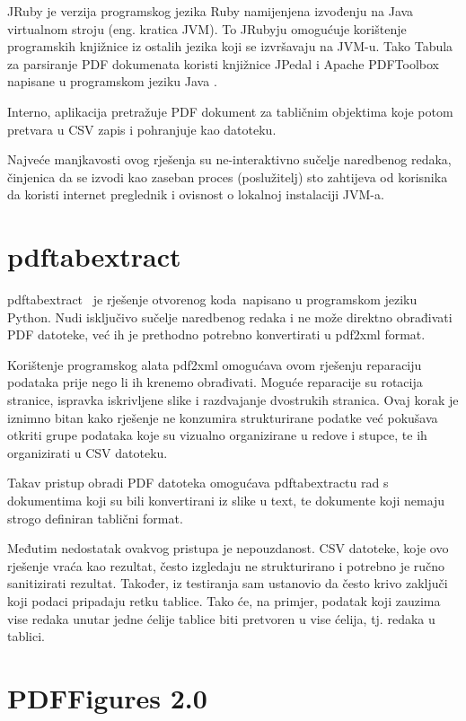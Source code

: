 \documentclass[times, utf8, zavrsni]{fer}
\begin{document}
JRuby je verzija programskog jezika Ruby namijenjena izvođenju na Java
virtualnom stroju \cite{java_virtual_machine_specification} (eng. kratica JVM).
To JRubyju omogućuje korištenje
programskih knjižnice iz ostalih jezika koji se izvršavaju na JVM-u. Tako
Tabula za parsiranje PDF dokumenata koristi knjižnice JPedal i Apache
PDFToolbox \cite{apache_pdftoolbox_specification} napisane u programskom
jeziku Java \cite{java_language_specification}.

Interno, aplikacija pretražuje PDF dokument za tabličnim objektima koje potom
pretvara u CSV zapis i pohranjuje kao datoteku.

Najveće manjkavosti ovog rješenja su ne-interaktivno sučelje naredbenog redaka,
činjenica da se izvodi kao zaseban proces (poslužitelj) sto zahtijeva od
korisnika
da koristi internet preglednik i ovisnost o lokalnoj instalaciji JVM-a.

\section{pdftabextract}

pdftabextract \cite{pdftabextract_repository} je rješenje otvorenog koda napisano
u programskom jeziku Python.
Nudi isključivo sučelje naredbenog redaka i ne može direktno obrađivati PDF
datoteke, već ih je prethodno potrebno konvertirati u pdf2xml format.

Korištenje programskog alata pdf2xml omogućava ovom rješenju reparaciju
podataka prije nego li ih krenemo obrađivati. Moguće reparacije su rotacija
stranice, ispravka iskrivljene slike i razdvajanje dvostrukih stranica. Ovaj
korak je iznimno bitan kako rješenje ne konzumira strukturirane podatke već
pokušava otkriti grupe podataka koje su vizualno organizirane u redove i
stupce, te ih organizirati u CSV datoteku.

Takav pristup obradi PDF datoteka omogućava pdftabextractu rad s dokumentima
koji su bili konvertirani iz slike u text, te dokumente koji nemaju strogo
definiran tablični format.

Međutim nedostatak ovakvog pristupa je nepouzdanost.
CSV datoteke, koje ovo rješenje vraća kao rezultat, često izgledaju ne
strukturirano i potrebno je ručno sanitizirati rezultat. Također, iz testiranja
sam ustanovio da često krivo zaključi koji podaci pripadaju retku tablice.
Tako će, na primjer, podatak koji zauzima vise redaka unutar jedne ćelije
tablice biti pretvoren u vise ćelija, tj. redaka u tablici.

\section{PDFFigures 2.0}
\end{document}
